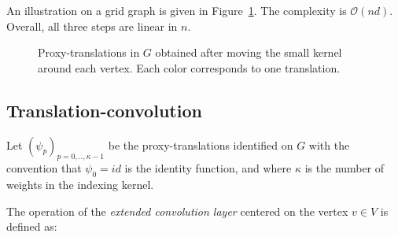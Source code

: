 An illustration on a grid graph is given in Figure~\ref{translations}. The complexity is $\mathcal{O}(nd)$. Overall, all three steps are linear in $n$.

\begin{figure}[h!]
  \begin{center}
  \end{center}
  \caption{Proxy-translations in $G$ obtained after moving the small kernel around each vertex. Each color corresponds to one translation.}
  \label{translations}
\end{figure}

\subsection{Translation-convolution}

Let $(\psi_p)_{p=0,..,\kappa-1}$ be the proxy-translations identified on $G$ with the convention that $\psi_0 = id$ is the identity function, and where $\kappa$ is the number of weights in the indexing kernel.

The operation of the \emph{extended convolution layer} centered on the vertex $v \in V$ is defined as:

